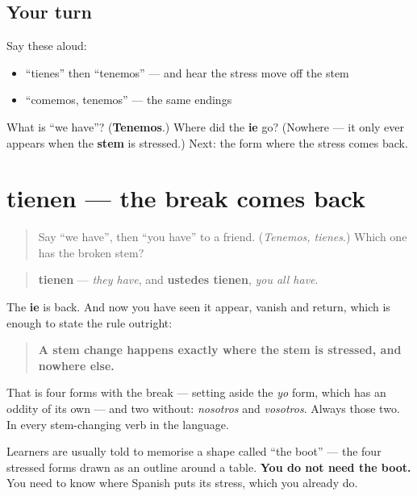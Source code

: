 \subsection*{Your turn}
Say these aloud:

\begin{itemize}
\raggedright
  \item \textquotedblleft{}tienes\textquotedblright{} then \textquotedblleft{}tenemos\textquotedblright{} — and hear the stress move off the stem
  \item \textquotedblleft{}comemos, tenemos\textquotedblright{} — the same endings
\end{itemize}

\begin{tcolorbox}[breakable,colback=teal!4,colframe=teal!35!black,title={Before you move on}]
What is \textquotedblleft{}we have\textquotedblright{}? (\textbf{Tenemos}.) Where did the \textbf{ie} go? (Nowhere — it only ever appears when the \textbf{stem} is stressed.) Next: the form where the stress comes back.
\end{tcolorbox}
\section[tienen]{tienen — the break comes back}

\label{lesson:ES-C08-tienen}



\begin{quote}
Say \textquotedblleft{}we have\textquotedblright{}, then \textquotedblleft{}you have\textquotedblright{} to a friend. (\emph{Tenemos, tienes}.) Which one has the broken stem?
\end{quote}

\begin{grammarlens}[title={Grammar Lens: the rule, stated once and for all}]
\begin{quote}
\textbf{tienen} — \emph{they have}, and \textbf{ustedes tienen}, \emph{you all have}.
\end{quote}

The \textbf{ie} is back. And now you have seen it appear, vanish and return, which is enough to state the rule outright:

\begin{quote}
\textbf{A stem change happens exactly where the stem is stressed, and nowhere else.}
\end{quote}

That is four forms with the break — setting aside the \emph{yo} form, which has an oddity of its own — and two without: \emph{nosotros} and \emph{vosotros}. Always those two. In every stem-changing verb in the language.

Learners are usually told to memorise a shape called \textquotedblleft{}the boot\textquotedblright{} — the four stressed forms drawn as an outline around a table. \textbf{You do not need the boot.} You need to know where Spanish puts its stress, which you already do.
\end{grammarlens}

